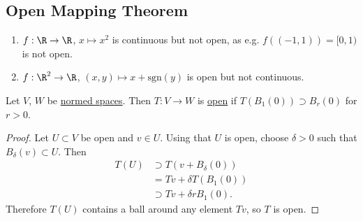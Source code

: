 \documentclass{article}
\begin{document}
\subsection{Open Mapping Theorem}

\begin{eg}
    \leavevmode
    \begin{enumerate}[label=(\roman*)]
        \item $f:\R \to \R$, $x \mapsto x^2$ is continuous but not open, as e.g. $f((-1, 1)) = [0, 1)$ is not open.
        \item $f:\R^2 \to \R$, $(x, y) \mapsto x + \mathrm{sgn}(y)$ is open but not continuous.
    \end{enumerate}
\end{eg}


\begin{lemma}
    Let $V$, $W$ be \hyperlink{def:normedVectorSpace}{normed spaces}. Then $T: V \to W$ is \hyperlink{def:openMap}{open} if $T(B_1(0)) \supset B_r(0)$ for $r > 0$.
\end{lemma}

\begin{proof}
    Let $U \subset V$ be open and $v \in U$. Using that $U$ is open, choose $\delta > 0$ such that $B_\delta(v) \subset U$. Then
    \begin{align*}
        T(U) &\supset T(v + B_\delta(0)) \\
             &=Tv + \delta T(B_1(0)) \\
             &\supset T v + \delta r B_1(0).
    \end{align*}
    Therefore $T(U)$ contains a ball around any element $Tv$, so $T$ is open.
\end{proof}
\end{document}
